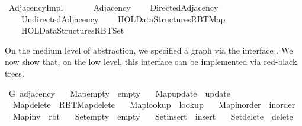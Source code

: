 %
\begin{isabellebody}%
%
%
\isadelimdocument
%
\endisadelimdocument
%
\isatagdocument
%
\isamarkuptrue%
%
\endisatagdocument
{\isafolddocument}%
%
\isadelimdocument
%
\endisadelimdocument
%
\isadelimtheory
%
\endisadelimtheory
%
\isatagtheory
{}\isamarkupfalse%
\ Adjacency{\isacharunderscore}{\kern0pt}Impl\isanewline
\ \ \isanewline
\ \ \ \ Adjacency\isanewline
\ \ \ \ Directed{\isacharunderscore}{\kern0pt}Adjacency\isanewline
\ \ \ \ Undirected{\isacharunderscore}{\kern0pt}Adjacency\isanewline
\ \ \ \ {\isachardoublequoteopen}HOL{\isacharminus}{\kern0pt}Data{\isacharunderscore}{\kern0pt}Structures{\isachardot}{\kern0pt}RBT{\isacharunderscore}{\kern0pt}Map{\isachardoublequoteclose}\isanewline
\ \ \ \ {\isachardoublequoteopen}HOL{\isacharminus}{\kern0pt}Data{\isacharunderscore}{\kern0pt}Structures{\isachardot}{\kern0pt}RBT{\isacharunderscore}{\kern0pt}Set{}{\isachardoublequoteclose}\isanewline
{}%
\endisatagtheory
{\isafoldtheory}%
%
\isadelimtheory
%
\endisadelimtheory
%
\begin{isamarkuptext}%
On the medium level of abstraction, we specified a graph via the interface . We
now show that, on the low level, this interface can be implemented via red-black trees.%
\end{isamarkuptext}\isamarkuptrue%
\isamarkupfalse%
\ G{\isacharcolon}{\kern0pt}\ adjacency\ \isanewline
\ \ Map{\isacharunderscore}{\kern0pt}empty\ {\isacharequal}{\kern0pt}\ empty\ \isanewline
\ \ Map{\isacharunderscore}{\kern0pt}update\ {\isacharequal}{\kern0pt}\ update\ \isanewline
\ \ Map{\isacharunderscore}{\kern0pt}delete\ {\isacharequal}{\kern0pt}\ RBT{\isacharunderscore}{\kern0pt}Map{\isachardot}{\kern0pt}delete\ \isanewline
\ \ Map{\isacharunderscore}{\kern0pt}lookup\ {\isacharequal}{\kern0pt}\ lookup\ \isanewline
\ \ Map{\isacharunderscore}{\kern0pt}inorder\ {\isacharequal}{\kern0pt}\ inorder\ \isanewline
\ \ Map{\isacharunderscore}{\kern0pt}inv\ {\isacharequal}{\kern0pt}\ rbt\ \isanewline
\ \ Set{\isacharunderscore}{\kern0pt}empty\ {\isacharequal}{\kern0pt}\ empty\ \isanewline
\ \ Set{\isacharunderscore}{\kern0pt}insert\ {\isacharequal}{\kern0pt}\ insert\ \isanewline
\ \ Set{\isacharunderscore}{\kern0pt}delete\ {\isacharequal}{\kern0pt}\ delete\ \isanewline

\end{isabellebody}
